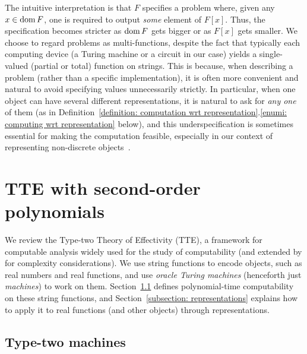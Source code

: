 \documentclass[envcountsect,envcountsame,orivec,oribibl]{llncs}
\newcommand{\dom}{\mathop{\rm dom}}
\newcommand{\pcolon}{\mathpunct{\,:\subseteq}}
\begin{document}
The intuitive interpretation is that 
$F$ specifies a problem where, 
given any $x \in \dom F$, 
one is required to output \emph{some} element of $F [x]$. 
Thus, the specification 
becomes stricter
as $\dom F$ gets bigger or as $F [x]$ gets smaller. 
We choose to regard problems as multi-functions, 
despite the fact that typically each computing device 
(a Turing machine or a circuit in our case) 
yields a single-valued (partial or total) function on strings. 
This is because, 
when describing a problem (rather than a specific implementation), 
it is often more convenient and natural to 
avoid specifying values unnecessarily strictly. 
In particular, 
when one object can have several different representations, 
it is natural to ask for \emph{any one} of them
(as in Definition~\ref{definition: computation wrt representation}.\ref{enumi: computing wrt representation} below), 
and this underspecification is 
sometimes essential for making the computation feasible, 
especially in our context of representing non-discrete objects~\cite{bhw}. 


\section{TTE with second-order polynomials}
\label{section: computable analysis}

We review the Type-two Theory of Effectivity (TTE), 
a framework for computable analysis 
widely used for the study of computability \cite{weihrauch00:_comput_analy}
(and extended by \cite{kawamura2012complexity} 
for complexity considerations). 
We use string functions to 
encode objects, such as real numbers and real functions, 
and use \emph{oracle Turing machines} (henceforth just \emph{machines}) 
to work on them.
Section~\ref{section:TTF} defines polynomial-time computability on 
these string functions, 
and Section~\ref{subsection: representations} explains how to 
apply it to real functions (and other objects) through representations. 

\subsection{Type-two machines}
\label{section:TTF}
\end{document}
